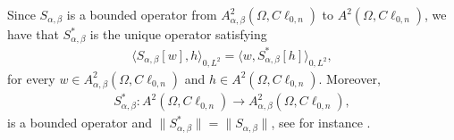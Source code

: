 \documentclass[12pt]{article}
\begin{document}
Since $S_{\alpha,\beta}$ is a bounded operator from $A_{\alpha,\beta}^2(\Omega,C\ell_{0,n})$ to $A^2(\Omega,C\ell_{0,n})$, we have that $S_{\alpha,\beta}^*$
is the unique operator satisfying
\begin{align*}
   \langle S_{\alpha,\beta}[w], h\rangle_{0,L^2}=\langle w, S_{\alpha,\beta}^*[h]\rangle_{0,L^2},
\end{align*}
for every $w\in A_{\alpha,\beta}^2(\Omega,C\ell_{0,n})$ and $h\in A^2(\Omega,C\ell_{0,n})$. Moreover, 
\begin{align}\label{eq:adjoint}
S_{\alpha,\beta}^*\colon A^2(\Omega,C\ell_{0,n})\to A_{\alpha,\beta}^2(\Omega,C\ell_{0,n}), 
\end{align}
is a bounded operator and $\|S_{\alpha,\beta}^*\|=\|S_{\alpha,\beta}\|$, see for instance \cite[Sec.\ 1.5]{Kub2012}.


\end{document}
